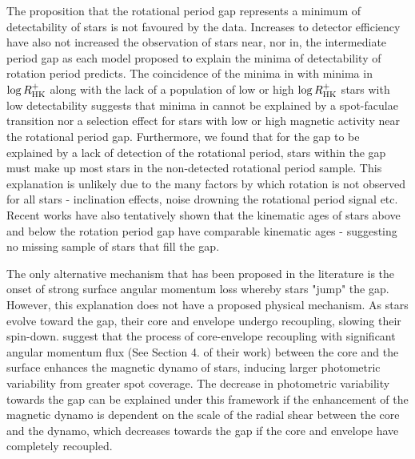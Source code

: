 The proposition that the rotational period gap represents a minimum of detectability of stars is not favoured by the data.
Increases to detector efficiency have also not increased the observation of stars near, nor in, the intermediate period gap as each model proposed to explain the minima of detectability of rotation period predicts.
The coincidence of the minima in \rper{} with minima in $\log R^{+}_{\rm{HK}}$ along with the lack of a population of low or high $\log R^{+}_{\rm{HK}}$ stars with low detectability suggests that minima in \rper{} cannot be explained by a spot-faculae transition nor a selection effect for stars with low or high magnetic activity near the rotational period gap.
Furthermore, we found that for the gap to be explained by a lack of detection of the rotational period, stars within the gap must make up most stars in the \kepler{} non-detected rotational period sample.
This explanation is unlikely due to the many factors by which rotation is not observed for all stars - inclination effects, noise drowning the rotational period signal etc.
Recent works have also tentatively shown that the kinematic ages of stars above and below the rotation period gap have comparable kinematic ages \citep{lu_bridging_2022} - suggesting no missing sample of stars that fill the gap.

The only alternative mechanism that has been proposed in the literature is the onset of strong surface angular momentum loss whereby stars "jump" the gap.
However, this explanation does not have a proposed physical mechanism.
As stars evolve toward the gap, their core and envelope undergo recoupling, slowing their spin-down.
\citet{cao_core-envelope_2023} suggest that the process of core-envelope recoupling with significant angular momentum flux (See Section 4. of their work) between the core and the surface enhances the magnetic dynamo of stars, inducing larger photometric variability from greater spot coverage.
The decrease in photometric variability towards the gap can be explained under this framework if the enhancement of the magnetic dynamo is dependent on the scale of the radial shear between the core and the dynamo, which decreases towards the gap if the core and envelope have completely recoupled.

